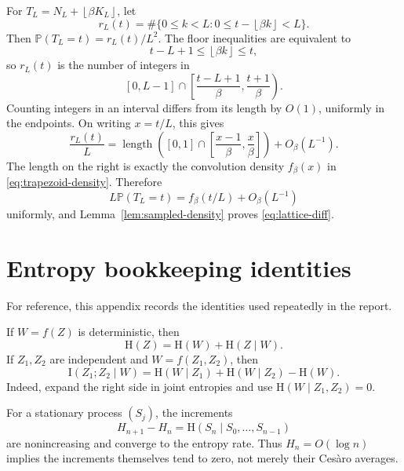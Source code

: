 \documentclass[11pt,oneside]{article}
\theoremstyle{definition}
\theoremstyle{remark}
\newcommand{\Pp}{\mathbb{P}}
\newcommand{\HH}{\mathrm{H}}
\newcommand{\II}{\mathrm{I}}
\newcommand{\floor}[1]{\left\lfloor #1\right\rfloor}
\begin{document}
For \(T_L=N_L+\floor{\beta K_L}\), let
\begin{equation}\label{eq:rLt}
 r_L(t)=\#\{0\leq k<L:0\leq t-\floor{\beta k}<L\}.
\end{equation}
Then \(\Pp(T_L=t)=r_L(t)/L^2\).  The floor inequalities are equivalent to
\begin{equation}\label{eq:k-interval}
 t-L+1\leq\floor{\beta k}\leq t,
\end{equation}
so \(r_L(t)\) is the number of integers in
\begin{equation}\label{eq:k-range}
 [0,L-1]\cap
 \left[\frac{t-L+1}{\beta},\frac{t+1}{\beta}\right).
\end{equation}
Counting integers in an interval differs from its length by \(O(1)\), uniformly in the endpoints.  On writing \(x=t/L\), this gives
\begin{equation}\label{eq:r-density}
 \frac{r_L(t)}{L}
 =\operatorname{length}\left(
 [0,1]\cap\left[\frac{x-1}{\beta},\frac{x}{\beta}\right]
 \right)+O_\beta(L^{-1}).
\end{equation}
The length on the right is exactly the convolution density \(f_\beta(x)\) in \eqref{eq:trapezoid-density}.  Therefore
\[
 L\Pp(T_L=t)=f_\beta(t/L)+O_\beta(L^{-1})
\]
uniformly, and Lemma~\ref{lem:sampled-density} proves \eqref{eq:lattice-diff}.

\section{Entropy bookkeeping identities}\label{app:bookkeeping}

For reference, this appendix records the identities used repeatedly in the report.

If \(W=f(Z)\) is deterministic, then
\begin{equation}\label{eq:deterministic-entropy-id}
 \HH(Z)=\HH(W)+\HH(Z\mid W).
\end{equation}
If \(Z_1,Z_2\) are independent and \(W=f(Z_1,Z_2)\), then
\begin{equation}\label{eq:interaction-id}
 \II(Z_1;Z_2\mid W)
 =\HH(W\mid Z_1)+\HH(W\mid Z_2)-\HH(W).
\end{equation}
Indeed, expand the right side in joint entropies and use \(\HH(W\mid Z_1,Z_2)=0\).

For a stationary process \((S_j)\), the increments
\begin{equation}\label{eq:entropy-increments}
 H_{n+1}-H_n=\HH(S_n\mid S_0,\ldots,S_{n-1})
\end{equation}
are nonincreasing and converge to the entropy rate.  Thus \(H_n=O(\log n)\) implies the increments themselves tend to zero, not merely their Ces\`aro averages.
\end{document}
